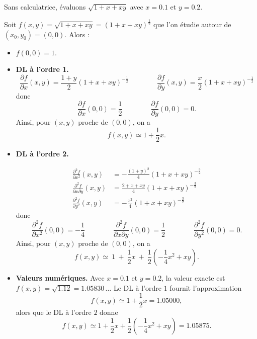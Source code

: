 \begin{exemple}
Sans calculatrice, évaluons $\sqrt{1+x+xy}$ avec $x=0.1$ et $y=0.2$.

Soit $f(x,y) = \sqrt{1+x+xy} = (1+x+xy)^{\frac12}$ que l'on étudie autour de $(x_0,y_0)=(0,0)$.
Alors :
\begin{itemize}
    \item $f(0,0) = 1$.
    
    \item \textbf{DL à l'ordre 1.}
    $$\frac{\partial f}{\partial x}(x,y) = \frac{1+y}{2}(1+x+xy)^{-\frac12}
    \qquad\qquad
    \frac{\partial f}{\partial y}(x,y) = \frac{x}{2}(1+x+xy)^{-\frac12}$$
    donc
    $$\frac{\partial f}{\partial x}(0,0) = \frac12
    \qquad\qquad
    \frac{\partial f}{\partial y}(0,0) = 0.$$
    Ainsi, pour $(x,y)$ proche de $(0,0)$, on a  
    $$f(x,y) \simeq 1+\frac12x.$$ 
      
    \item \textbf{DL à l'ordre 2.} 
    
    \begin{align*}
    \frac{\partial^2f}{\partial x^2}(x,y) &=  -\frac{(1+y)^2}{4}(1+x+xy)^{-\frac32}\\
    \frac{\partial^2f}{\partial x\partial y}(x,y) &= \frac{2+x+xy}{4}(1+x+xy)^{-\frac32}\\
    \frac{\partial^2f}{\partial y^2}(x,y) &= -\frac{x^2}{4}(1+x+xy)^{-\frac32}
    \end{align*}
    donc 
    $$\frac{\partial^2f}{\partial x^2}(0,0) = -\frac14\qquad \qquad
    \frac{\partial^2f}{\partial x\partial y}(0,0) = \frac12 \qquad\qquad
    \frac{\partial^2f}{\partial y^2}(0,0) = 0.$$ 
    Ainsi, pour $(x,y)$ proche de $(0,0)$, on a 
    $$   
    f(x,y) 
    \simeq \ 1 \  + \  \frac12x
    \  +\ 
    \frac12\left(-\frac14x^2+ xy\right).
    $$
    
      
\item \textbf{Valeurs numériques.}
    Avec $x=0.1$ et $y=0.2$, la valeur exacte est $f(x,y) = \sqrt{1.12} = 1.05830\,\ldots$
    Le DL à l'ordre $1$ fournit l'approximation 
    $$f(x,y) \simeq 1+\frac12x = 1.05000,$$    
    alors que le DL à l'ordre $2$ donne
    $$f(x,y) \simeq 1 + \frac12x + \frac12\left(-\frac14x^2+ xy\right) = 1.05875.$$   
    
\end{itemize}  
       
\end{exemple}   
  


